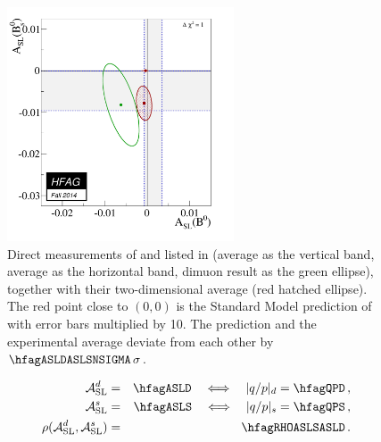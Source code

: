 \begin{figure}
\begin{center}
\includegraphics[width=0.6\textwidth]{figures/life_mix/asls_asld}
\end{center}
\vspace{-5mm}
\caption{
Direct measurements of \ASLs and \ASLd listed in 
(\Bd average as the vertical band, \Bs average as the horizontal band,
\dzero dimuon result as the green ellipse),
together with their two-dimensional average (red hatched ellipse).
The red point close to $(0,0)$ is the Standard Model prediction
of  with error bars multiplied by 10.
The prediction and the experimental average deviate from each other by $\hfagASLDASLSNSIGMA\,\sigma$.}
\end{figure}
\begin{eqnarray}
\ASLd & = & \hfagASLD ~~~ \Longleftrightarrow ~~~ |q/p|_{\particle{d}} = \hfagQPD \,,
\labe{ASLD}
\\
\ASLs & = & \hfagASLS ~~~ \Longleftrightarrow ~~~ |q/p|_{\particle{s}} = \hfagQPS \,,
\labe{ASLS}
\\
\rho(\ASLd , \ASLs) & = & \hfagRHOASLSASLD \,.
\labe{rhoASLDASLS}
\end{eqnarray}

